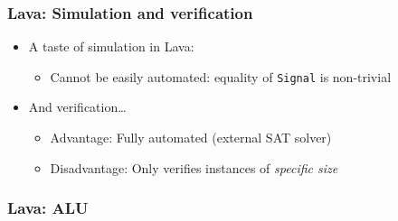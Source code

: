         \begin{frame}
            \frametitle{Lava: Simulation and verification}

            \begin{itemize}
                \item A taste of simulation in Lava:
                    \begin{itemize}
                        \item Cannot be easily automated: equality of \texttt{Signal} is non-trivial
                    \end{itemize}

                \item And verification\ldots
                    \begin{itemize}
                        \item Advantage: Fully automated (external SAT solver)
                        \item Disadvantage: Only verifies instances of \emph{specific size}
                    \end{itemize}
            \end{itemize}

        \end{frame}

        \begin{frame}
            \frametitle{Lava: ALU}
        \end{frame}

